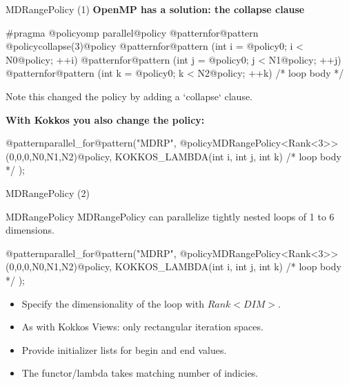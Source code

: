 \begin{frame}[fragile]{MDRangePolicy (1)}
   \textbf{OpenMP has a solution: the collapse clause}

  \begin{code}[linebackgroundcolor={
        \btLstHL<1->{5}{bodyColor}
      },
      frame=single
    ]
#pragma @policyomp parallel@policy @patternfor@pattern @policycollapse(3)@policy
@patternfor@pattern (int i = @policy0; i < N0@policy; ++i) {
  @patternfor@pattern (int j = @policy0; j < N1@policy; ++j) {
    @patternfor@pattern (int k = @policy0; k < N2@policy; ++k) {
      /* loop body */
    }
  }
}
  \end{code}

  \pause

Note this changed the policy by adding a `collapse` clause.

\pause

	\vspace{0.5cm}

	\textbf{With Kokkos you also change the policy:}

  \begin{code}[linebackgroundcolor={
        \btLstHL<1->{3}{bodyColor}
      },
      frame=single
    ]
@patternparallel_for@pattern("MDRP", @policyMDRangePolicy<Rank<3>>({0,0,0},{N0,N1,N2})@policy, 
   KOKKOS_LAMBDA(int i, int j, int k) {
     /* loop body */
});
  \end{code}

\end{frame}

\begin{frame}[fragile]{MDRangePolicy (2)}

\begin{block}{MDRangePolicy}
   MDRangePolicy can parallelize tightly nested loops of 1 to 6 dimensions.
\end{block}

	\vspace{0.5cm}

  \begin{code}[linebackgroundcolor={
        \btLstHL<1->{3}{bodyColor}
      },
      frame=single
    ]
@patternparallel_for@pattern("MDRP", @policyMDRangePolicy<Rank<3>>({0,0,0},{N0,N1,N2})@policy, 
   KOKKOS_LAMBDA(int i, int j, int k) {
     /* loop body */
});
  \end{code}

\begin{itemize}
   \item<2-> Specify the dimensionality of the loop with $Rank<DIM>$.
   \item<3-> As with Kokkos Views: only rectangular iteration spaces.
   \item<4-> Provide initializer lists for begin and end values.
   \item<5-> The functor/lambda takes matching number of indicies. 
\end{itemize}
\end{frame}

